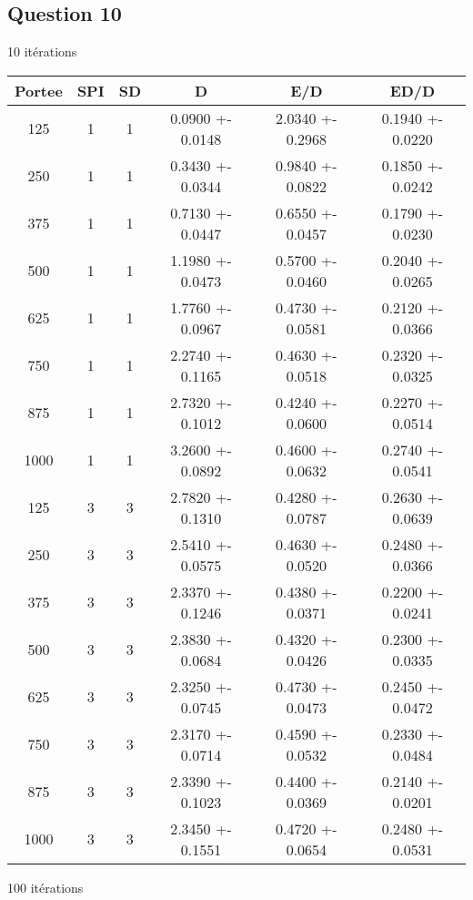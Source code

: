 \documentclass[a4paper]{article}
\begin{document}
\pagebreak
\subsection{Question 10}
10 itérations
\begin{center}
\begin{tabular}{|c|c|c|c|c|c|}
  \hline
Portee & SPI & SD & D & E/D & ED/D \\\hline
125 & 1 & 1 & 0.0900 +- 0.0148 & 2.0340 +- 0.2968 & 0.1940 +- 0.0220 \\\hline
250 & 1 & 1 & 0.3430 +- 0.0344 & 0.9840 +- 0.0822 & 0.1850 +- 0.0242 \\\hline
375 & 1 & 1 & 0.7130 +- 0.0447 & 0.6550 +- 0.0457 & 0.1790 +- 0.0230 \\\hline
500 & 1 & 1 & 1.1980 +- 0.0473 & 0.5700 +- 0.0460 & 0.2040 +- 0.0265 \\\hline
625 & 1 & 1 & 1.7760 +- 0.0967 & 0.4730 +- 0.0581 & 0.2120 +- 0.0366 \\\hline
750 & 1 & 1 & 2.2740 +- 0.1165 & 0.4630 +- 0.0518 & 0.2320 +- 0.0325 \\\hline
875 & 1 & 1 & 2.7320 +- 0.1012 & 0.4240 +- 0.0600 & 0.2270 +- 0.0514 \\\hline
1000 & 1 & 1 & 3.2600 +- 0.0892 & 0.4600 +- 0.0632 & 0.2740 +- 0.0541 \\\hline
125 & 3 & 3 & 2.7820 +- 0.1310 & 0.4280 +- 0.0787 & 0.2630 +- 0.0639 \\\hline
250 & 3 & 3 & 2.5410 +- 0.0575 & 0.4630 +- 0.0520 & 0.2480 +- 0.0366 \\\hline
375 & 3 & 3 & 2.3370 +- 0.1246 & 0.4380 +- 0.0371 & 0.2200 +- 0.0241 \\\hline
500 & 3 & 3 & 2.3830 +- 0.0684 & 0.4320 +- 0.0426 & 0.2300 +- 0.0335 \\\hline
625 & 3 & 3 & 2.3250 +- 0.0745 & 0.4730 +- 0.0473 & 0.2450 +- 0.0472 \\\hline
750 & 3 & 3 & 2.3170 +- 0.0714 & 0.4590 +- 0.0532 & 0.2330 +- 0.0484 \\\hline
875 & 3 & 3 & 2.3390 +- 0.1023 & 0.4400 +- 0.0369 & 0.2140 +- 0.0201 \\\hline
1000 & 3 & 3 & 2.3450 +- 0.1551 & 0.4720 +- 0.0654 & 0.2480 +- 0.0531 \\\hline
\end{tabular}
\end{center}

100 itérations
\end{document}
